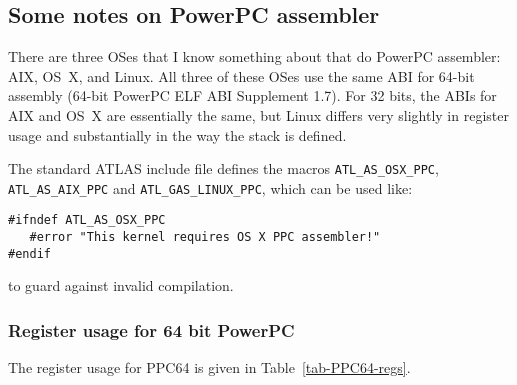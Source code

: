 \documentclass[11pt]{article}
\begin{document}
\subsection{Some notes on PowerPC assembler}
There are three OSes that I know something about that do PowerPC assembler:
AIX, OS~X, and Linux.  All three of these OSes use the same ABI for 64-bit
assembly (64-bit PowerPC ELF ABI Supplement 1.7).  For 32 bits, the ABIs
for AIX and OS~X are essentially the same,
but Linux differs very slightly in register usage and substantially in
the way the stack is defined.

The standard ATLAS include file defines the macros {\tt ATL\_AS\_OSX\_PPC},
{\tt ATL\_AS\_AIX\_PPC} and {\tt ATL\_GAS\_LINUX\_PPC}, which can be used like:
\begin{verbatim}
#ifndef ATL_AS_OSX_PPC
   #error "This kernel requires OS X PPC assembler!"
#endif
\end{verbatim}
to guard against invalid compilation.

\subsubsection{Register usage for 64 bit PowerPC}
The register usage for PPC64 is given in Table~\ref{tab-PPC64-regs}.
\end{document}
